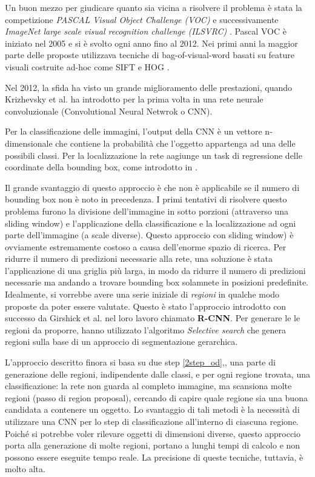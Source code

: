 Un buon mezzo per giudicare quanto sia vicina a risolvere il problema è stata la competizione \textit{PASCAL Visual Object Challenge (VOC)} e successivamente \textit{ImageNet large scale visual recognition challenge (ILSVRC)} \cite{russakovsky2015imagenet}. Pascal VOC è iniziato nel 2005 e si è svolto ogni anno fino al 2012. Nei primi anni la maggior parte delle proposte utilizzava tecniche di bag-of-visual-word basati su feature visuali costruite ad-hoc come SIFT \cite{sift} e HOG \cite{hog}.

Nel 2012, la sfida ha visto un grande miglioramento delle prestazioni, quando Krizhevsky et al. \cite{krizhevsky2012imagenet} ha introdotto per la prima volta in una rete neurale convoluzionale (Convolutional Neural Netwrok o CNN).

Per la classificazione delle immagini, l'output della CNN è un vettore n-dimensionale che contiene la probabilità che l'oggetto appartenga ad una delle possibili classi. Per la localizzazione la rete aagiunge un task di regressione delle coordinate della bounding box, come introdotto in \cite{krizhevsky2012imagenet}.

Il grande svantaggio di questo approccio è che non è applicabile se il numero di bounding box non è noto in precedenza. I primi tentativi di risolvere questo problema furono la divisione dell'immagine in sotto porzioni (attraverso una sliding window) e l'applicazione della classificazione e la localizzazione ad ogni parte dell'immagine (a scale diverse). Questo approccio con sliding window) è ovviamente estremamente costoso a causa dell'enorme spazio di ricerca. Per ridurre il numero di predizioni necessarie alla rete, una soluzione è stata l'applicazione di una griglia più larga, in modo da ridurre il numero di predizioni necessarie ma andando a trovare bounding box solamnete in posizioni predefinite. Idealmente, si vorrebbe avere una serie iniziale di \textit{regioni} in qualche modo proposte da poter essere valutate. Questo è stato l'approccio introdotto con successo da Girshick et al. \cite{girshick2014rich} nel loro lavoro chiamato \textbf{R-CNN}. Per generare le le regioni da proporre, hanno utilizzato l'algoritmo \textit{Selective search} \cite{uijlings2013selective} che genera regioni sulla base di un approccio di segmentazione gerarchica.


L'approccio descritto finora si basa su due step \ref{2step_od},, una parte di generazione delle regioni, indipendente dalle classi, e per ogni regione trovata, una classificazione:  la rete non guarda al completo immagine, ma scansiona molte regioni (passo di region proposal), cercando di capire quale regione sia una buona candidata a contenere un oggetto. Lo svantaggio di tali metodi è la necessità di utilizzare una CNN per lo step di classificazione all'interno di ciascuna regione. Poiché si potrebbe voler rilevare oggetti di dimensioni diverse, questo approccio porta alla generazione di molte regioni, portano a lunghi tempi di calcolo e non possono essere eseguite tempo reale. La precisione di queste tecniche, tuttavia, è molto alta.

